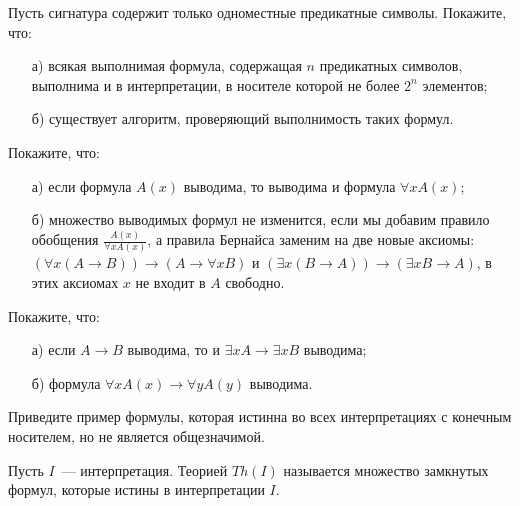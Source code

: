 
\begin{task}
	Пусть сигнатура содержит только одноместные предикатные символы. Покажите, что:
    \begin{enumerate}[topsep = 0pt, itemsep = -1ex]
        \item [а)] всякая выполнимая формула, содержащая $n$ предикатных символов, выполнима и в интерпретации, в носителе которой
    		не более $2^n$ элементов;
        \item [б)] существует алгоритм, проверяющий выполнимость таких формул.
    \end{enumerate}
\end{task}


\begin{task}
    Покажите, что:
    \begin{enumerate}[topsep = 0pt, itemsep = -1ex]
        \item [а)] если формула $A(x)$ выводима, то выводима и формула $\forall x A(x)$;
        \item [б)] множество выводимых формул не изменится, если мы добавим правило обобщения $\frac{A(x)}{\forall x A(x)}$, а
    		правила Бернайса заменим на две новые аксиомы:\\ $(\forall x (A \to B)) \to (A \to \forall x B)$ и
			$(\exists x (B \to A)) \to (\exists x B \to A)$, в этих аксиомах $x$ не входит в $A$ свободно.
    \end{enumerate}
\end{task}

\begin{task}
    Покажите, что:
    \begin{enumerate}[topsep = 0pt, itemsep = -1ex]
        \item [а)] если $A \to B$ выводима, то и $\exists x A \to \exists x B$ выводима;
        \item [б)] формула $\forall x A(x)\to \forall y A(y)$ выводима.
    \end{enumerate}
\end{task}


\begin{task}
	Приведите пример формулы, которая истинна во всех интерпретациях с конечным носителем, но не является общезначимой.
\end{task}


Пусть $I$~--- интерпретация. Теорией $Th(I)$ называется множество замкнутых формул, которые истины в интерпретации $I$.

